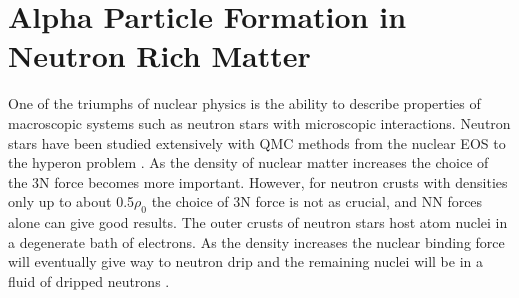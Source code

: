 \section{Alpha Particle Formation in Neutron Rich Matter}
One of the triumphs of nuclear physics is the ability to describe properties of macroscopic systems such as neutron stars with microscopic interactions. Neutron stars have been studied extensively with QMC methods from the nuclear EOS \cite{sarsa2003,gandolfi2014} to the hyperon problem \cite{lonardoni2015,gandolfi2018}. As the density of nuclear matter increases the choice of the 3N force becomes more important. However, for neutron crusts with densities only up to about 0.5$\rho_0$ the choice of 3N force is not as crucial, and NN forces alone can give good results. The outer crusts of neutron stars host atom nuclei in a degenerate bath of electrons. As the density increases the nuclear binding force will eventually give way to neutron drip and the remaining nuclei will be in a fluid of dripped neutrons \cite{}. 
